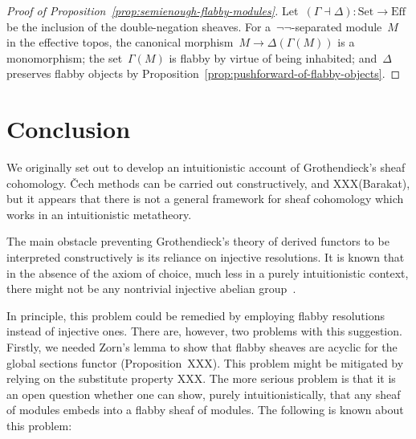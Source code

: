 \documentclass[oneside]{amsart}
\theoremstyle{definition}
\theoremstyle{plain}
\theoremstyle{remark}
\newcommand{\Set}{\mathrm{Set}}
\newcommand{\Eff}{\mathrm{Ef{}f}}
\renewcommand{\_}{\mathpunct{.}\,}
\begin{document}
\begin{proof}[Proof of Proposition~\ref{prop:semienough-flabby-modules}]
Let~$(\Gamma \dashv \Delta) : \Set \to \Eff$ be the inclusion of the
double-negation sheaves. For a~$\neg\neg$-separated module~$M$ in the effective
topos, the canonical morphism~$M \to \Delta(\Gamma(M))$ is a monomorphism; the
set~$\Gamma(M)$ is flabby by virtue of being inhabited; and~$\Delta$ preserves
flabby objects by Proposition~\ref{prop:pushforward-of-flabby-objects}.
\end{proof}


\section{Conclusion}
\label{sect:conclusion}

We originally set out to develop an intuitionistic account of Grothendieck's
sheaf cohomology. Čech methods can be carried out constructively, and
XXX(Barakat), but it appears that there is not a general framework for sheaf
cohomology which works in an intuitionistic metatheory.

The main obstacle preventing Grothendieck's theory of derived functors to be interpreted
constructively is its reliance on injective resolutions. It is known that in
the absence of the axiom of choice, much less in a purely intuitionistic
context, there might not be any nontrivial injective abelian
group~\cite{blass:inj-proj-axc}.

In principle, this problem could be remedied by employing flabby resolutions
instead of injective ones. There are, however, two problems with this
suggestion. Firstly, we needed Zorn's lemma to show that flabby sheaves are
acyclic for the global sections functor (Proposition~XXX). This problem might
be mitigated by relying on the substitute property XXX.
The more serious problem is that it is an open question whether
one can show, purely intuitionistically, that any sheaf of modules embeds into
a flabby sheaf of modules. The following is known about this problem:
\end{document}
